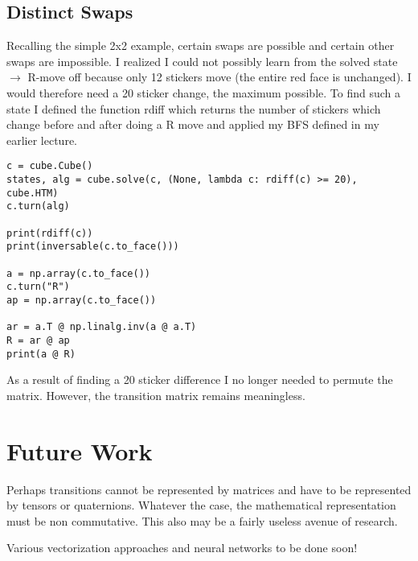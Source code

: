 \documentclass[11pt, oneside]{article}
\begin{document}
\subsection{Distinct Swaps}

Recalling the simple 2x2 example, certain swaps are possible and certain other swaps are
impossible. I realized I could not possibly learn from the solved state \( \to \) R-move off because only
12 stickers move (the entire red face is unchanged). I would therefore need a 20 sticker change, the maximum possible.
To find such a state I defined the function rdiff which returns the number of stickers which change before and after doing a R move
and applied my BFS defined in my earlier lecture.

\begin{verbatim}
c = cube.Cube()
states, alg = cube.solve(c, (None, lambda c: rdiff(c) >= 20), cube.HTM)
c.turn(alg)

print(rdiff(c))
print(inversable(c.to_face()))

a = np.array(c.to_face())
c.turn("R")
ap = np.array(c.to_face())

ar = a.T @ np.linalg.inv(a @ a.T)
R = ar @ ap
print(a @ R)
\end{verbatim}

As a result of finding a 20 sticker difference I no longer needed to permute the matrix. However, the transition matrix remains meaningless.

\section{Future Work}

Perhaps transitions cannot be represented by matrices
and have to be represented by tensors or quaternions.
Whatever the case, the mathematical representation must be non commutative.
This also may be a fairly useless avenue of research.

Various vectorization approaches and neural networks to be done soon!
\end{document}
